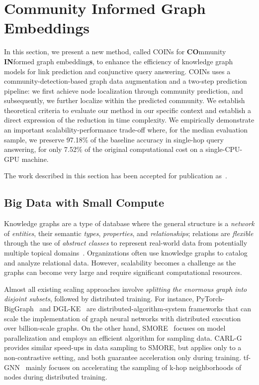 \section{Community Informed Graph Embeddings}
\label{sec: coins}

In this section, we present a new method, called COINs for \textbf{CO}mmunity \textbf{IN}formed graph embedding\textbf{s}, to enhance the efficiency of knowledge graph models for link prediction and conjunctive query answering. COINs uses a community-detection-based graph data augmentation and a two-step prediction pipeline: we first achieve node localization through community prediction, and subsequently, we further localize within the predicted community. We establish theoretical criteria to evaluate our method in our specific context and establish a direct expression of the reduction in time complexity. We empirically demonstrate an important scalability-performance trade-off where, for the median evaluation sample, we preserve 97.18\% of the baseline accuracy in single-hop query answering, for only 7.52\% of the original computational cost on a single-CPU-GPU machine. 

The work described in this section has been accepted for publication as~\cite{janchevski_coins_2025}.

\subsection{Big Data with Small Compute}
Knowledge graphs are a type of database where the general structure is a \emph{network} of \emph{entities}, their semantic \emph{types}, \emph{properties}, and \emph{relationships}; relations are \emph{flexible} through the use of \emph{abstract classes} to represent real-world data from potentially multiple topical domains~\cite{ehrlinger_towards_2016,hogan_knowledge_2020}. Organizations often use knowledge graphs to catalog and analyze relational data. However, scalability becomes a challenge as the graphs can become very large and require significant computational resources.

Almost all existing scaling approaches involve \emph{splitting the enormous graph into disjoint subsets}, followed by distributed training.
For instance, PyTorch-BigGraph~\cite{lerer_pytorch-biggraph_2019} and DGL-KE~\cite{zheng_dgl-ke_2020} are distributed-algorithm-system frameworks that can scale the implementation of graph neural networks with distributed execution over billion-scale graphs.
On the other hand, SMORE~\cite{ren_smore_2021} focuses on model parallelization and employs an efficient algorithm for sampling data. CARL-G~\cite{shiao_carl-g_2023} provides similar speed-ups in data sampling to SMORE, but applies only to a non-contrastive setting, and both guarantee acceleration only during training. tf-GNN~\cite{ferludin_tf-gnn_2022} mainly focuses on accelerating the sampling of k-hop neighborhoods of nodes during distributed training.


